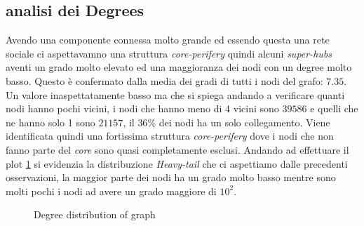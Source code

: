 \documentclass[a4paper]{article}
\begin{document}
\subsection{analisi dei Degrees}
Avendo una componente connessa molto grande ed essendo questa una rete sociale ci aspettavamno una struttura \textit{core-perifery} quindi alcuni \textit{super-hubs} aventi un grado molto elevato ed una maggioranza dei nodi con un degree molto basso.
Questo è confermato dalla media dei gradi di tutti i nodi del grafo: $7.35$.
Un valore inaspettatamente basso ma che si spiega andando a verificare quanti nodi hanno pochi vicini, i nodi che hanno meno di 4 vicini sono $39586$ e quelli che ne hanno solo 1 sono $21157$, il $36\%$ dei nodi ha un solo collegamento.
Viene identificata quindi una fortissima struttura \textit{core-perifery} dove i nodi che non fanno parte del \textit{core} sono quasi completamente esclusi.
Andando ad effettuare il plot \ref{FIG:degree_dist_G} si evidenzia la distribuzione \textit{Heavy-tail} che ci aspettiamo dalle precedenti osservazioni, la maggior parte dei nodi ha un grado molto basso mentre sono molti pochi i nodi ad avere un grado maggiore di $10^2$.
\begin{figure}[!ht]
\centering
{}
\caption{Degree distribution of graph} \label{FIG:degree_dist_G}
\end{figure}
\end{document}
